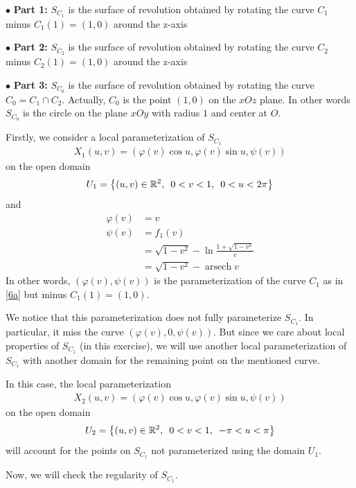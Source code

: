 \documentclass[a4paper]{report}
\DeclareMathOperator{\arsech}{arsech}
\begin{document}
$\bullet$ \textbf{Part 1:} $S_{C_1}$ is the surface of revolution obtained by rotating the curve $C_1$ minus $C_1(1)=(1,0)$ around the z-axis

$\bullet$ \textbf{Part 2:} $S_{C_2}$ is the surface of revolution obtained by rotating the curve $C_2$ minus $C_2(1)=(1,0)$ around the z-axis

$\bullet$ \textbf{Part 3:} $S_{C_0}$ is the surface of revolution obtained by rotating the curve $C_0 = C_1 \cap C_2$. Actually, $C_0$ is the point $(1,0)$ on the $xOz$ plane. In other words $S_{C_0}$ is the circle on the plane $xOy$ with radius $1$ and center at $O$.

Firstly, we consider a local parameterization of $S_{C_1}$
\begin{align}
	X_1(u,v) = \left(\varphi(v) \cos u, \varphi(v) \sin u, \psi(v) \right)
\end{align}
on the open domain
\begin{align}
	U_1 = \left\{ (u,v) \in \mathbb{R}^2, \enskip 0< v < 1, \enskip 0 < u < 2\pi \right\}
\end{align}
and 
\begin{align}
	\varphi(v) &= v\\
	\psi(v) &= f_1(v)\\
	&= \sqrt{1 - v^2} - \ln\frac{1 + \sqrt{1 - v^2}}{v}\\
	&= \sqrt{1 - v^2} - \arsech v
\end{align}
In other words, $(\varphi(v), \psi(v))$ is the parameterization of the curve $C_1$ as in \ref{6a} but minus $C_1(1)=(1,0)$.

We notice that this parameterization does not fully parameterize $S_{C_1}$. In particular, it miss the curve $(\varphi(v),0,\psi(v))$. But since we care about local properties of $S_{C_1}$ (in this exercise), we will use another local parameterization of $S_{C_1}$ with another domain for the remaining point on the mentioned curve.

In this case, the local parameterization
\begin{align}
X_2(u,v) = \left(\varphi(v) \cos u, \varphi(v) \sin u, \psi(v) \right)
\end{align}
on the open domain
\begin{align}
U_2 = \left\{ (u,v) \in \mathbb{R}^2, \enskip 0< v < 1, \enskip -\pi < u < \pi \right\}
\end{align}
will account for the points on $S_{C_1}$ not parameterized using the domain $U_1$.

Now, we will check the regularity of $S_{C_1}$.
\end{document}
